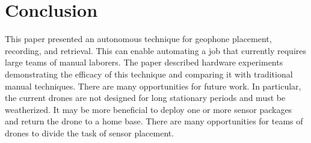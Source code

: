  \section{Conclusion}\label{sec:Conclusion}
This paper presented an autonomous technique for geophone placement, recording, and retrieval. This can enable automating a job that currently requires large teams of manual laborers.  
 The paper described hardware experiments demonstrating the efficacy of this technique and comparing it with traditional manual techniques. There are many opportunities for future work. In particular, the current drones are not designed for long stationary periods and must be weatherized. It may be more beneficial to deploy one or more sensor packages and return the drone to a home base. There are many opportunities for teams of drones to divide the task of sensor placement.